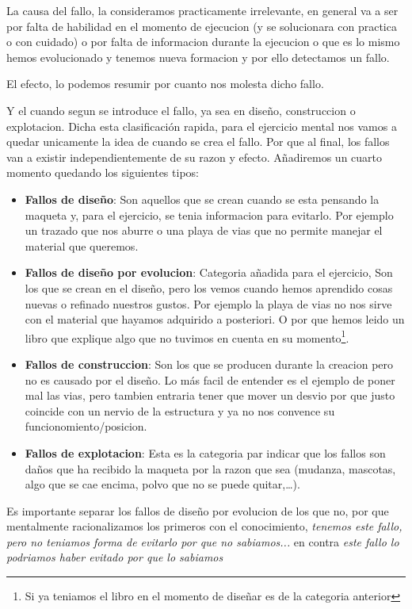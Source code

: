 La causa del fallo, la consideramos practicamente irrelevante, en general va a ser por falta de habilidad en el momento de ejecucion (y se solucionara con practica o con cuidado) o por falta de informacion durante la ejecucion o que es lo mismo hemos evolucionado y tenemos nueva formacion y por ello detectamos un fallo. 

El efecto, lo podemos resumir por cuanto nos molesta dicho fallo.

Y el cuando segun se introduce el fallo, ya sea en diseño, construccion o explotacion. Dicha esta clasificación rapida, para el ejercicio mental nos vamos a quedar unicamente la idea de cuando se crea el fallo. Por que al final, los fallos van a existir independientemente de su razon y efecto. Añadiremos un cuarto momento quedando los siguientes tipos:
\begin{itemize}
	\item \textbf{Fallos de diseño}: Son aquellos que se crean cuando se esta pensando la maqueta y, para el ejercicio, se tenia informacion para evitarlo. Por ejemplo un trazado que nos aburre o una playa de vias que no permite manejar el material que queremos. 
	\item \textbf{Fallos de diseño por evolucion}: Categoria añadida para el ejercicio, Son los que se crean en el diseño, pero los vemos cuando hemos aprendido cosas nuevas o refinado nuestros gustos. Por ejemplo la playa de vias no nos sirve con el material que hayamos adquirido a posteriori. O por que hemos leido un libro que explique algo que no tuvimos en cuenta en su momento\footnote{Si ya teniamos el libro en el momento de diseñar es de la categoria anterior}.
	\item \textbf{Fallos de construccion}: Son los que se producen durante la creacion pero no es causado por el diseño. Lo más facil de entender es el ejemplo de poner mal las vias, pero tambien entraria tener que mover un desvio por que justo coincide con un nervio de la estructura y ya no nos convence su funcionomiento/posicion.
	\item \textbf{Fallos de explotacion}: Esta es la categoria par indicar que los fallos son daños que ha recibido la maqueta por la razon que sea (mudanza, mascotas, algo que se cae encima, polvo que no se puede quitar,\dots).
\end{itemize}

Es importante separar los fallos de diseño por evolucion de los que no, por que mentalmente racionalizamos los primeros con el conocimiento, \emph{tenemos este fallo, pero no teniamos forma de evitarlo por que no sabiamos...} en contra \emph{este fallo lo podriamos haber evitado por que lo sabiamos}


